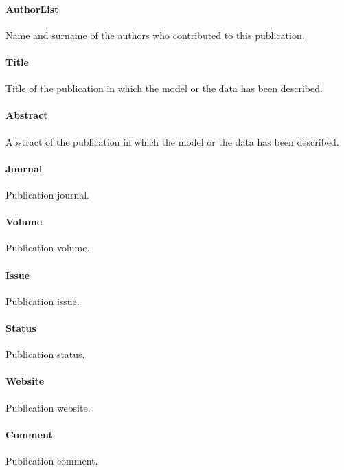 \documentclass[a4paper]{report}
\begin{document}
\paragraph{AuthorList}
Name and surname of the authors who contributed to this publication.

\paragraph{Title}
Title of the publication in which the model or the data has been described.

\paragraph{Abstract}
Abstract of the publication in which the model or the data has been described.

\paragraph{Journal}
Publication journal.

\paragraph{Volume}
Publication volume.

\paragraph{Issue}
Publication issue.

\paragraph{Status}
Publication status.

\paragraph{Website}
Publication website.

\paragraph{Comment}
Publication comment.
\end{document}
